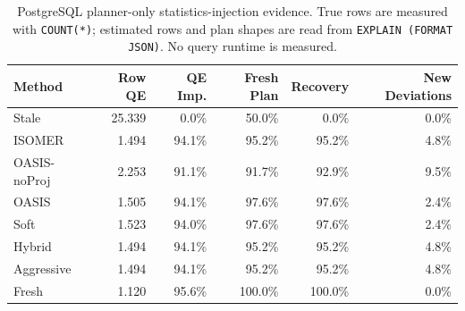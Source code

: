 \begin{table}[t]
  \centering
  \small
  \caption{PostgreSQL planner-only statistics-injection evidence. True rows are measured with \texttt{COUNT(*)}; estimated rows and plan shapes are read from \texttt{EXPLAIN (FORMAT JSON)}. No query runtime is measured.}
  \label{tab:postgres_planner_stats_injection}
  \setlength{\tabcolsep}{4pt}
  \begin{tabular}{lrrrrr}
    \toprule
    Method & Row QE & QE Imp. & Fresh Plan & Recovery & New Deviations \\
    \midrule
    Stale & 25.339 & 0.0\% & 50.0\% & 0.0\% & 0.0\% \\
    ISOMER & 1.494 & 94.1\% & 95.2\% & 95.2\% & 4.8\% \\
    OASIS-noProj & 2.253 & 91.1\% & 91.7\% & 92.9\% & 9.5\% \\
    OASIS & 1.505 & 94.1\% & 97.6\% & 97.6\% & 2.4\% \\
    Soft & 1.523 & 94.0\% & 97.6\% & 97.6\% & 2.4\% \\
    Hybrid & 1.494 & 94.1\% & 95.2\% & 95.2\% & 4.8\% \\
    Aggressive & 1.494 & 94.1\% & 95.2\% & 95.2\% & 4.8\% \\
    Fresh & 1.120 & 95.6\% & 100.0\% & 100.0\% & 0.0\% \\
    \bottomrule
  \end{tabular}
\end{table}
